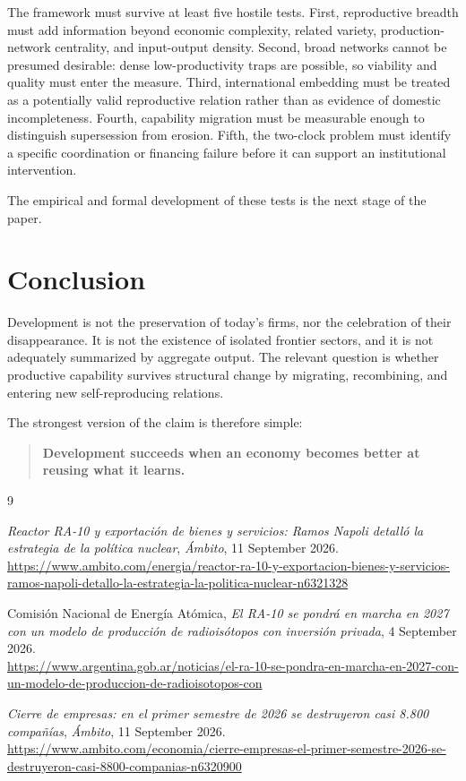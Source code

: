 \documentclass[11pt]{article}
\begin{document}
The framework must survive at least five hostile tests. First, reproductive breadth must add information beyond economic complexity, related variety, production-network centrality, and input-output density. Second, broad networks cannot be presumed desirable: dense low-productivity traps are possible, so viability and quality must enter the measure. Third, international embedding must be treated as a potentially valid reproductive relation rather than as evidence of domestic incompleteness. Fourth, capability migration must be measurable enough to distinguish supersession from erosion. Fifth, the two-clock problem must identify a specific coordination or financing failure before it can support an institutional intervention.

The empirical and formal development of these tests is the next stage of the paper.

\section{Conclusion}

Development is not the preservation of today's firms, nor the celebration of their disappearance. It is not the existence of isolated frontier sectors, and it is not adequately summarized by aggregate output. The relevant question is whether productive capability survives structural change by migrating, recombining, and entering new self-reproducing relations.

The strongest version of the claim is therefore simple:

\begin{quote}
\textbf{Development succeeds when an economy becomes better at reusing what it learns.}
\end{quote}

\begin{thebibliography}{9}

\emph{Reactor RA-10 y exportaci\'on de bienes y servicios: Ramos Napoli detall\'o la estrategia de la pol\'itica nuclear}, \emph{\'Ambito}, 11 September 2026.\\
\url{https://www.ambito.com/energia/reactor-ra-10-y-exportacion-bienes-y-servicios-ramos-napoli-detallo-la-estrategia-la-politica-nuclear-n6321328}

Comisi\'on Nacional de Energ\'ia At\'omica, \emph{El RA-10 se pondr\'a en marcha en 2027 con un modelo de producci\'on de radiois\'otopos con inversi\'on privada}, 4 September 2026.\\
\url{https://www.argentina.gob.ar/noticias/el-ra-10-se-pondra-en-marcha-en-2027-con-un-modelo-de-produccion-de-radioisotopos-con}

\emph{Cierre de empresas: en el primer semestre de 2026 se destruyeron casi 8.800 compa\~n\'ias}, \emph{\'Ambito}, 11 September 2026.\\
\url{https://www.ambito.com/economia/cierre-empresas-el-primer-semestre-2026-se-destruyeron-casi-8800-companias-n6320900}

\end{thebibliography}
\end{document}

